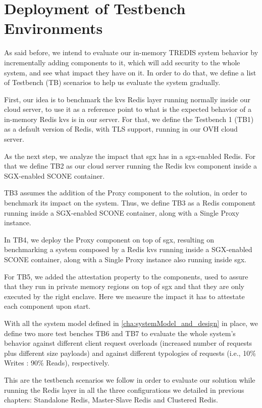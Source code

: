 \section{Deployment of Testbench Environments}
\label{sec:testBenchEnvironments}

As said before, we intend to evaluate our in-memory TREDIS system behavior by incrementally adding components to it, which will add security to the whole system, and see what impact they have on it. In order to do that, we define a list of Testbench (TB) scenarios to help us evaluate the system gradually.

First, our idea is to benchmark the \gls{kvs} Redis layer running normally inside our cloud server, to use it as a reference point to what is the expected behavior of a in-memory Redis \gls{kvs} is in our server. For that, we define the Testbench 1 (TB1) as a default version of Redis, with TLS support, running in our OVH cloud server.

As the next step, we analyze the impact that \gls{sgx} has in a \gls{sgx}-enabled Redis. For that we define TB2 as our cloud server running the Redis \gls{kvs} component inside a SGX-enabled SCONE container.

TB3 assumes the addition of the Proxy component to the solution, in order to benchmark its impact on the system. Thus, we define TB3 as a Redis component running inside a SGX-enabled SCONE container, along with a Single Proxy instance.

In TB4, we deploy the Proxy component on top of \gls{sgx}, resulting on benchmarking a system composed by a Redis \gls{kvs} running inside a SGX-enabled SCONE container, along with a Single Proxy instance also running inside \gls{sgx}.

For TB5, we added the attestation property to the components, used to assure that they run in private memory regions on top of \gls{sgx} and that they are only executed by the right enclave. Here we measure the impact it has to attestate each component upon start.

With all the system model defined in \ref{cha:systemModel_and_design} in place, we define two more test benches TB6 and TB7 to evaluate the whole system's behavior against different client request overloads (increased number of requests plus different size payloads) and against different typologies of requests (i.e., 10\% Writes : 90\% Reads), respectively.

This are the testbench scenarios we follow in order to evaluate our solution while running the Redis layer in all the three configurations we detailed in previous chapters: Standalone Redis, Master-Slave Redis and Clustered Redis.


